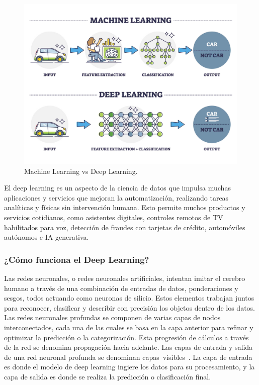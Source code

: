 \documentclass{article}
\begin{document}
\begin{figure}[H]
    \centering
    \includegraphics[scale=0.075]{mlvsdp.png}
    \caption{Machine Learning vs Deep Learning.}
\end{figure}

El deep learning es un aspecto de la ciencia de datos que impulsa muchas aplicaciones y servicios que mejoran la automatización, realizando tareas analíticas y físicas sin intervención humana. Esto permite muchos productos y servicios cotidianos, como asistentes digitales, controles remotos de TV habilitados para voz, detección de fraudes con tarjetas de crédito, automóviles autónomos e IA generativa. \\

\newpage

\subsubsection{¿Cómo funciona el Deep Learning?}
Las redes neuronales, o redes neuronales artificiales, intentan imitar el cerebro humano a través de una combinación de entradas de datos, ponderaciones y sesgos, todos actuando como neuronas de silicio. Estos elementos trabajan juntos para reconocer, clasificar y describir con precisión los objetos dentro de los datos. \\

Las redes neuronales profundas se componen de varias capas de nodos interconectados, cada una de las cuales se basa en la capa anterior para refinar y optimizar la predicción o la categorización. Esta progresión de cálculos a través de la red se denomina propagación hacia adelante. Las capas de entrada y salida de una red neuronal profunda se denominan capas visibles . La capa de entrada es donde el modelo de deep learning ingiere los datos para su procesamiento, y la capa de salida es donde se realiza la predicción o clasificación final. \\
\end{document}
